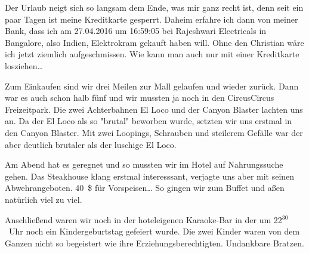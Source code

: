 Der Urlaub neigt sich so langsam dem Ende, was mir ganz recht ist, denn seit ein paar Tagen ist meine Kreditkarte gesperrt.
Daheim erfahre ich dann von meiner Bank, dass ich am 27.04.2016 um 16:59:05 bei Rajeshwari Electricals in Bangalore, also Indien, Elektrokram gekauft haben will.
Ohne den Christian wäre ich jetzt ziemlich aufgeschmissen.
Wie kann man auch nur mit einer Kreditkarte losziehen\dots

Zum Einkaufen sind wir drei Meilen zur Mall gelaufen und wieder zurück.
Dann war es auch schon halb fünf und wir mussten ja noch in den CircusCircus Freizeitpark.
Die zwei Achterbahnen El Loco und der Canyon Blaster lachten uns an.
Da der El Loco als so "brutal" beworben wurde, setzten wir uns erstmal in den Canyon Blaster.
Mit zwei Loopings, Schrauben und steilerem Gefälle war der aber deutlich brutaler als der luschige El Loco.

Am Abend hat es geregnet und so mussten wir im Hotel auf Nahrungssuche gehen.
Das Steakhouse klang erstmal interesssant, verjagte uns aber mit seinen Abwehrangeboten.
40~\$ für Vorspeisen\dots
So gingen wir zum Buffet und aßen natürlich viel zu viel.

Anschließend waren wir noch in der hoteleigenen Karaoke-Bar in der um 22$^{30}$~Uhr noch ein Kindergeburtstag gefeiert wurde.
Die zwei Kinder waren von dem Ganzen nicht so begeistert wie ihre Erziehungsberechtigten.
Undankbare Bratzen.
